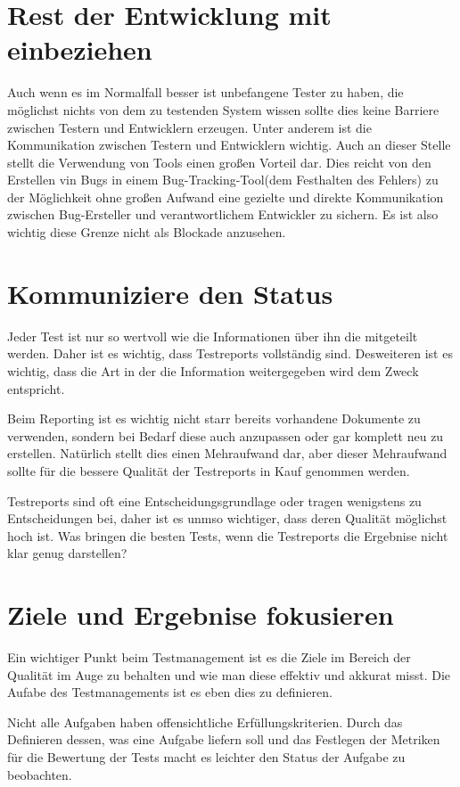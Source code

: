 \section{Rest der Entwicklung mit einbeziehen}
Auch wenn es im Normalfall besser ist unbefangene Tester zu haben, die m\"oglichst nichts von dem zu testenden System wissen sollte dies keine Barriere zwischen Testern und Entwicklern erzeugen. Unter anderem ist die Kommunikation zwischen Testern und Entwicklern wichtig. Auch an dieser Stelle stellt die Verwendung von Tools einen gro\ss{}en Vorteil dar. Dies reicht von den Erstellen vin Bugs in einem Bug-Tracking-Tool(dem Festhalten des Fehlers) zu der M\"oglichkeit ohne gro\ss{}en Aufwand eine gezielte und direkte Kommunikation zwischen Bug-Ersteller und verantwortlichem Entwickler zu sichern. Es ist also wichtig diese Grenze nicht als Blockade anzusehen.

\section{Kommuniziere den Status}
Jeder Test ist nur so wertvoll wie die Informationen \"uber ihn die mitgeteilt werden. Daher ist es wichtig, dass Testreports vollst\"andig sind. Desweiteren ist es wichtig, dass die Art in der die Information weitergegeben wird dem Zweck entspricht.

Beim Reporting ist es wichtig nicht starr bereits vorhandene Dokumente zu verwenden, sondern bei Bedarf diese auch anzupassen oder gar komplett neu zu erstellen. Nat\"urlich stellt dies einen Mehraufwand dar, aber dieser Mehraufwand sollte f\"ur die bessere Qualit\"at der Testreports in Kauf genommen werden.

Testreports sind oft eine Entscheidungsgrundlage oder tragen wenigstens zu Entscheidungen bei, daher ist es unmso wichtiger, dass deren Qualit\"at m\"oglichst hoch ist. Was bringen die besten Tests, wenn die Testreports die Ergebnise nicht klar genug darstellen?

\section{Ziele und Ergebnise fokusieren}
Ein wichtiger Punkt beim Testmanagement ist es die Ziele im Bereich der Qualit\"at im Auge zu behalten und wie man diese effektiv und akkurat misst. Die Aufabe des Testmanagements ist es eben dies zu definieren.

Nicht alle Aufgaben haben offensichtliche Erf\"ullungskriterien. Durch das Definieren dessen, was eine Aufgabe liefern soll und das Festlegen der Metriken f\"ur die Bewertung der Tests macht es leichter den Status der Aufgabe zu beobachten.

